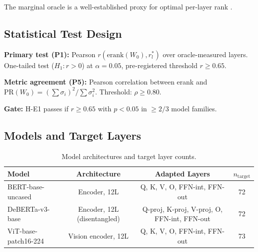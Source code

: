 The marginal oracle is a well-established proxy for optimal per-layer rank \cite{Zhang2023AdaLoRA,Tripathi2026LAARA}.

\subsection{Statistical Test Design}

\textbf{Primary test (P1):} Pearson $r(\text{erank}(W_0), r_l^*)$ over oracle-measured layers. One-tailed test ($H_1: r > 0$) at $\alpha = 0.05$, pre-registered threshold $r \geq 0.65$.

\textbf{Metric agreement (P5):} Pearson correlation between erank and $\text{PR}(W_0) = (\sum \sigma_i)^2 / \sum \sigma_i^2$. Threshold: $\rho \geq 0.80$.

\textbf{Gate:} H-E1 passes if $r \geq 0.65$ with $p < 0.05$ in $\geq 2/3$ model families.

\subsection{Models and Target Layers}

\begin{table}[h]
\centering
\caption{Model architectures and target layer counts.}
\label{tab:models}
\begin{tabular}{lccc}
\toprule
Model & Architecture & Adapted Layers & $n_{\text{target}}$ \\
\midrule
BERT-base-uncased & Encoder, 12L & Q, K, V, O, FFN-int, FFN-out & 72 \\
DeBERTa-v3-base & Encoder, 12L (disentangled) & Q-proj, K-proj, V-proj, O, FFN-int, FFN-out & 72 \\
ViT-base-patch16-224 & Vision encoder, 12L & Q, K, V, O, FFN-int, FFN-out & 73 \\
\bottomrule
\end{tabular}
\end{table}
